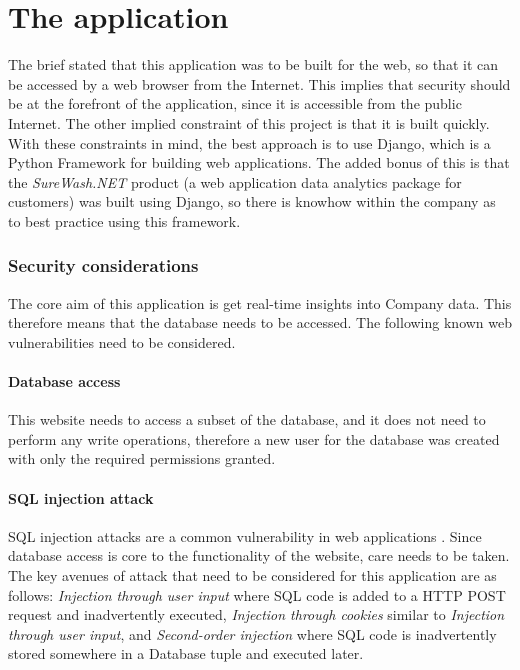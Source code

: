 \section{The application}
The brief stated that this application was to be built for the web, so that it can be accessed by a web browser from the Internet. This implies that security should be at the forefront of the application, since it is accessible from the public Internet. The other implied constraint of this project is that it is built quickly. With these constraints in mind, the best approach is to use Django, which is a Python Framework for building web applications. The added bonus of this is that the {\slshape SureWash.NET} product (a web application data analytics package for customers) was built using Django, so there is knowhow within the company as to best practice using this framework.
    \subsubsection{Security considerations}
    The core aim of this application is get real-time insights into Company data. This therefore means that the database needs to be accessed. The following known web vulnerabilities need to be considered.
        \paragraph{Database access} This website needs to access a subset of the database, and it does not need to perform any write operations, therefore a new user for the database was created with only the required permissions granted.
        \paragraph{SQL injection attack}
        SQL injection attacks are a common vulnerability in web applications \cite{halfond2006classification}. Since database access is core to the functionality of the website, care needs to be taken. The key avenues of attack that need to be considered for this application are as follows: {\slshape Injection through user input} where SQL code is added to a HTTP POST request and inadvertently executed, {\slshape Injection through cookies} similar to {\slshape Injection through user input}, and {\slshape Second-order injection} where SQL code is inadvertently stored somewhere in a Database tuple and executed later.

